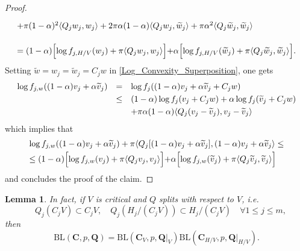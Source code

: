 \documentclass[11pt,a4paper,reqno]{amsart}
\numberwithin{equation}{section}
\newtheorem{lemma}[theorem]{Lemma}
\theoremstyle{definition}
\newcommand{\nm}{\noalign{\smallskip}}
\renewcommand{\tilde}{\widetilde}
\newcommand{\<}{\ensuremath \leq}
\renewcommand{\>}{\ensuremath \geq}
\renewcommand{\tilde}{\widetilde}
\begin{document}
\begin{proof}
$$\begin{array}{lll}
    \nm 
    +\pi(1-\alpha)^2 \langle Q_jw_j,w_j \rangle+2\pi \alpha(1-\alpha) \langle Q_jw_j,\tilde w_j\rangle+\pi \alpha^2 \langle Q_j \tilde w_j, \tilde w_j \rangle \\ \\
    \nm 
    = (1-\alpha) \Bigl[ \log f_{j,H/V}(w_j)+\pi \langle Q_jw_j,w_j \rangle \Bigl]+ \alpha \Bigl[\log f_{j,H/V}(\tilde w_j)+\pi \langle Q_j\tilde w_j,\tilde w_j \rangle \Bigl].
    \end{array}$$ Setting $\tilde w=w_j=\tilde w_j=C_jw$ in \cref{Log_Convexity_Superposition}, one gets $$\begin{array}{lll}
    \log f_{j,w}((1-\alpha)v_j+\alpha \tilde v_j) &=& \log f_j((1-\alpha)v_j+\alpha \tilde v_j+C_jw) \\
    \nm 
    &\leq& (1-\alpha)\log f_j(v_j+C_jw)+\alpha \log f_j(\tilde v_j+C_jw) \\
    \nm 
    && +\pi \alpha (1-\alpha)\langle Q_j(v_j-\tilde v_j),v_j-\tilde v_j\rangle 
    \end{array}$$ which implies that $$\begin{array}{lll}
    \log f_{j,w}((1-\alpha)v_j+\alpha \tilde v_j)+\pi \langle Q_j[(1-\alpha )v_j+\alpha \tilde v_j],(1-\alpha)v_j+\alpha \tilde v_j\rangle \leq \\
    \nm 
    \leq (1-\alpha)\Bigl[\log f_{j,w}(v_j)+\pi \langle Q_jv_j,v_j \rangle \Bigl] +\alpha \Bigl[ \log f_{j,w}(\tilde v_j)+\pi \langle Q_j\tilde v_j,\tilde v_j\rangle \Bigl]
    \end{array}$$ and concludes the proof of the claim. 
\end{proof} 

\begin{lemma}
    In fact, if $V$ is critical and $Q$ splits with respect to $V$, \textit{i.e.} $$\quad Q_j(C_j V) \subset C_jV,\quad Q_j(H_j/(C_j V)) \subset H_j/(C_jV) \quad \forall 1 \leq j \leq m,$$ then $$\mathrm{BL}(\textbf{C},p,\textbf{Q})=\mathrm{BL}(\textbf{C}_V,p,\textbf{Q}|_V)\mathrm{BL}(\textbf{C}_{H/V},p,\textbf{Q}|_{H/V}).$$
\end{lemma}
\end{document}
